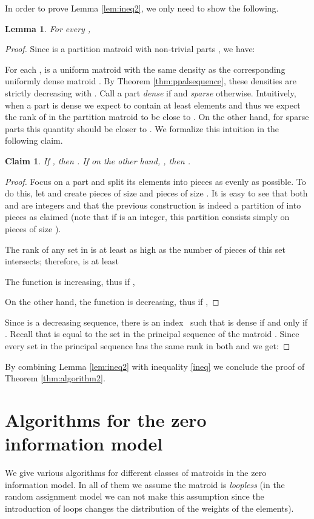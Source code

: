 \documentclass[letterpaper,11pt]{article}
\newtheorem{lem}[thm]{Lemma}
\newtheorem{Claim}{Claim}
\theoremstyle{definition}
\theoremstyle{remark}
\begin{document}
In order to prove Lemma \ref{lem:ineq2}, we only need to show the following.

\begin{lem}\label{lem:expectedrank}
  For every , 
\end{lem}
\begin{proof}
Since  is a partition matroid with non-trivial parts , we have:


For each ,  is a uniform matroid with the same density  as the corresponding uniformly dense matroid . By Theorem \ref{thm:ppalsequence}, these densities are strictly decreasing with .
Call a part  \emph{dense} if  and \emph{sparse} otherwise. Intuitively, when a part  is dense we expect  to contain at least  elements and thus we expect the rank of  in the partition matroid to be close to . On the other hand, for sparse parts this quantity should be closer to . We formalize this intuition in the following claim.

\begin{Claim} If , then . If on the other hand, , then .
\end{Claim}

\begin{proof}
Focus on a part  and split its elements into  pieces as evenly as possible. To do this, let  and create  pieces of size  and  pieces of size . It is easy to see that both  and  are integers and that the previous construction is indeed a partition of  into  pieces as claimed (note that if  is an integer, this partition consists simply on  pieces of size ).

The rank of any set in  is at least as high as the number of pieces of  this set intersects; therefore,  is at least


The function  is increasing, thus if ,


On the other hand, the function  is decreasing, thus if ,
  
\end{proof}
Since  is a decreasing sequence, there is an index~ such that  is dense if and only if . Recall that  is equal to the set  in the principal sequence of the matroid . Since every set in the principal sequence has the same rank in both  and  we get:

\end{proof}

By combining Lemma \ref{lem:ineq2} with inequality \eqref{ineq} we conclude the proof of Theorem \ref{thm:algorithm2}.

\section{Algorithms for the zero information model}\label{section5}
We give various algorithms for different classes of matroids in the zero information model. In all of them we assume the matroid is \emph{loopless} (in the random assignment model we can not make this assumption since the introduction of loops changes the distribution of the weights of the elements).
\end{document}
